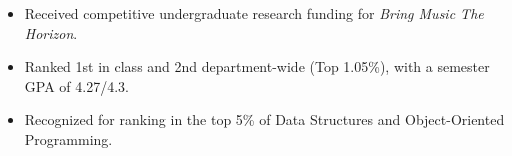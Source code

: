 \documentclass[10pt,a4paper,ragged2e,withhyper,normalphoto]{altacv}
\begin{document}

\begin{itemize}
  \item Received competitive undergraduate research funding for \textit{Bring Music The Horizon}.
\end{itemize}
\divider

\begin{itemize}
  \item Ranked 1st in class and 2nd department-wide (Top 1.05\%), with a semester GPA of 4.27/4.3.
\end{itemize}
\divider

\begin{itemize}
  \item Recognized for ranking in the top 5\% of Data Structures and Object-Oriented Programming.
\end{itemize}
\end{document}
